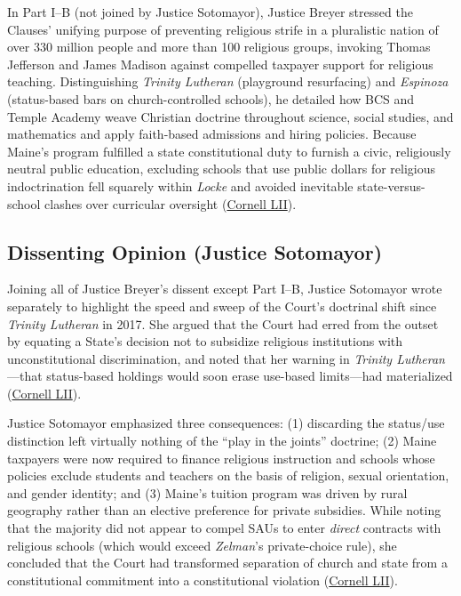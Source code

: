\documentclass[12pt]{article}
\begin{document}
In Part I--B (not joined by Justice Sotomayor), Justice Breyer stressed the Clauses' unifying purpose of preventing religious strife in a pluralistic nation of over 330 million people and more than 100 religious groups, invoking Thomas Jefferson and James Madison against compelled taxpayer support for religious teaching. Distinguishing \textit{Trinity Lutheran} (playground resurfacing) and \textit{Espinoza} (status-based bars on church-controlled schools), he detailed how BCS and Temple Academy weave Christian doctrine throughout science, social studies, and mathematics and apply faith-based admissions and hiring policies. Because Maine's program fulfilled a state constitutional duty to furnish a civic, religiously neutral public education, excluding schools that use public dollars for religious indoctrination fell squarely within \textit{Locke} and avoided inevitable state-versus-school clashes over curricular oversight (\href{https://www.law.cornell.edu/supremecourt/text/20-1088}{Cornell LII}).

\subsection{Dissenting Opinion (Justice Sotomayor)}

Joining all of Justice Breyer's dissent except Part I--B, Justice Sotomayor wrote separately to highlight the speed and sweep of the Court's doctrinal shift since \textit{Trinity Lutheran} in 2017. She argued that the Court had erred from the outset by equating a State's decision not to subsidize religious institutions with unconstitutional discrimination, and noted that her warning in \textit{Trinity Lutheran}---that status-based holdings would soon erase use-based limits---had materialized (\href{https://www.law.cornell.edu/supremecourt/text/20-1088}{Cornell LII}).

Justice Sotomayor emphasized three consequences: (1) discarding the status/use distinction left virtually nothing of the ``play in the joints'' doctrine; (2) Maine taxpayers were now required to finance religious instruction and schools whose policies exclude students and teachers on the basis of religion, sexual orientation, and gender identity; and (3) Maine's tuition program was driven by rural geography rather than an elective preference for private subsidies. While noting that the majority did not appear to compel SAUs to enter \textit{direct} contracts with religious schools (which would exceed \textit{Zelman}'s private-choice rule), she concluded that the Court had transformed separation of church and state from a constitutional commitment into a constitutional violation (\href{https://www.law.cornell.edu/supremecourt/text/20-1088}{Cornell LII}).
\end{document}
